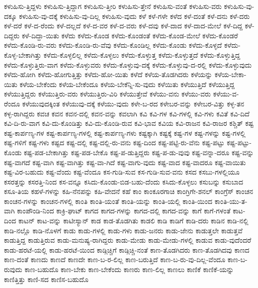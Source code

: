 {ಕಳುಹಿಸು-ತ್ತಿದ್ದಳು
ಕಳುಹಿಸು-ತ್ತಿದ್ದಾಗ
ಕಳುಹಿಸು-ತ್ತೀರಿ
ಕಳುಹಿಸು-ತ್ತೇನೆ
ಕಳುಹಿಸು-ವಂತೆ
ಕಳುಹಿಸು-ವರು
ಕಳುಹಿಸು-ವು-ದಕ್ಕೂ
ಕಳುಹಿಸು-ವು-ದಕ್ಕೆ
ಕಳುಹಿಸು-ವು-ದಿಲ್ಲ
ಕಳುಹಿಸು-ವುದು
ಕಳೆ
ಕಳೆ-ಗಳೇ
ಕಳೆದ
ಕಳೆ-ದಂತೆ
ಕಳೆ-ದನು
ಕಳೆ-ದರು
ಕಳೆ-ದರೆ
ಕಳೆ-ದ-ರೆಂದು
ಕಳೆ-ದಲ್ಲದೆ
ಕಳೆ-ದ-ವರ
ಕಳೆ-ದ-ವರು
ಕಳೆ-ದವು
ಕಳೆ-ದಾದ
ಕಳೆ-ದಾದ-ಮೇಲೆ
ಕಳೆ-ದಿದ್ದ
ಕಳೆ-ದಿದ್ದರು
ಕಳೆ-ದಿದ್ದಾ-ಯಿತು
ಕಳೆದು
ಕಳೆದು-ಕೊಂಡ
ಕಳೆದು-ಕೊಂಡಂತೆ
ಕಳೆದು-ಕೊಂಡ-ಮೇಲೆ
ಕಳೆದು-ಕೊಂಡರೆ
ಕಳೆದು-ಕೊಂಡಿ-ರು-ವರು
ಕಳೆದು-ಕೊಂಡಿ-ರು-ವೆವು
ಕಳೆದು-ಕೊಂಡಿಲ್ಲ
ಕಳೆದು-ಕೊಂಡು
ಕಳೆದು-ಕೊಳ್ಳದೆ
ಕಳೆದು-ಕೊಳ್ಳ-ಬೇಕಾಗಿತ್ತು
ಕಳೆದು-ಕೊಳ್ಳಲಿಲ್ಲ
ಕಳೆದು-ಕೊಳ್ಳಲು
ಕಳೆದು-ಕೊಳ್ಳುತ್ತ
ಕಳೆದು-ಕೊಳ್ಳುತ್ತದೆ
ಕಳೆದು-ಕೊಳ್ಳುತ್ತಿದ್ದ
ಕಳೆದು-ಕೊಳ್ಳುತ್ತಿರು-ವಾಗ
ಕಳೆದು-ಕೊಳ್ಳುವರು
ಕಳೆದು-ಕೊಳ್ಳುವು-ದಕ್ಕೆ
ಕಳೆದು-ಕೊಳ್ಳುವು-ದ-ರಲ್ಲಿ
ಕಳೆದು-ಕೊಳ್ಳುವುದು
ಕಳೆದು-ಹೋಗಿ
ಕಳೆದು-ಹೋಗುತ್ತಿತ್ತು
ಕಳೆದು-ಹೋ-ಯಿತು
ಕಳೆದೆ
ಕಳೆಯ-ತೊಡಗಿದರು
ಕಳೆಯನ್ನು
ಕಳೆಯ-ಬೇಕಾ-ಯಿತು
ಕಳೆಯ-ಬೇಕೆಂದು
ಕಳೆಯ-ಬೇಕೆಂದೂ
ಕಳೆಯ-ಬೇಕೆನ್ನಿ-ಸು-ವುದು
ಕಳೆಯಿತು
ಕಳೆಯುತ್ತಿದೆ
ಕಳೆಯುತ್ತಿದ್ದ
ಕಳೆಯುತ್ತಿದ್ದರು
ಕಳೆಯುತ್ತಿರು-ವರು
ಕಳೆಯುತ್ತಿರು-ವಿರಿ
ಕಳೆಯುತ್ತೇವೆ
ಕಳೆಯು-ವನು
ಕಳೆಯು-ವರು
ಕಳೆಯು-ವ-ರೆಂದೂ
ಕಳೆಯುವುದಕ್ಕಿಂತ
ಕಳೆಯುವು-ದಕ್ಕೆ
ಕಳೆಯು-ವುದು
ಕಳೇ-ಬ-ರದ
ಕಳೇಬರ-ವನ್ನು
ಕಳೇಬರ-ವಿತ್ತು
ಕಳ್ಳ-ತನ
ಕಳ್ಳ-ರಾಗಿದ್ದರು
ಕವಚ
ಕವನ
ಕವನ-ದಲ್ಲಿ
ಕವನ-ವನ್ನು
ಕವಲಾಗಿ
ಕವಿ
ಕವಿ-ಗಳ
ಕವಿ-ಗಳಲ್ಲಿ
ಕವಿ-ಗಳು
ಕವಿತೆ
ಕವಿ-ದಿದೆ
ಕವಿ-ದಿ-ರು-ವಾಗ
ಕವಿ-ದು-ಕೊಂಡಿತ್ತು
ಕವಿ-ದು-ಕೊಂಡಿ-ರುವ
ಕವಿ-ಭಾವ
ಕವಿಯ
ಕವಿ-ರಾಜನ
ಕವಿ-ರಾಜರ
ಕಶ್ಚಿತ್
ಕಷ್ಟ
ಕಷ್ಟ-ಕಾರ್ಪಣ್ಯ-ಗಳ
ಕಷ್ಟ-ಕಾರ್ಪಣ್ಯ-ಗಳಲ್ಲಿ
ಕಷ್ಟ-ಕಾರ್ಪಣ್ಯ-ಗಳು
ಕಷ್ಟಕ್ಕಾಗಿ
ಕಷ್ಟಕ್ಕೆ
ಕಷ್ಟ-ಗಳ
ಕಷ್ಟ-ಗಳನ್ನು
ಕಷ್ಟ-ಗಳಲ್ಲಿ
ಕಷ್ಟ-ಗಳಿಗೆ
ಕಷ್ಟ-ಗಳು
ಕಷ್ಟದ
ಕಷ್ಟ-ದಲ್ಲಿ
ಕಷ್ಟ-ದಲ್ಲಿ-ರು-ವನು
ಕಷ್ಟ-ದಿಂದ
ಕಷ್ಟ-ಪಟ್ಟಿ-ರು-ವೆನು
ಕಷ್ಟ-ಪಟ್ಟು
ಕಷ್ಟ-ಪಟ್ಟು-ಕೊಂಡು
ಕಷ್ಟ-ಪಡ-ಬೇಕಾಗಿತ್ತು
ಕಷ್ಟ-ಪಡ-ಬೇಕೊ
ಕಷ್ಟ-ಪ-ಡುತ್ತಿದ್ದರು
ಕಷ್ಟ-ಪ-ಡು-ವುವು
ಕಷ್ಟ-ವನ್ನಾ-ದರೂ
ಕಷ್ಟ-ವನ್ನು
ಕಷ್ಟ-ವಾಗದೆ
ಕಷ್ಟ-ವಾಗಿ
ಕಷ್ಟ-ವಾಗಿತ್ತು
ಕಷ್ಟ-ವಾ-ಗಿದೆ
ಕಷ್ಟ-ವಾಗು-ವುದು
ಕಷ್ಟ-ವಾದ
ಕಷ್ಟ-ವಾದರೂ
ಕಷ್ಟ-ವಾಯಿತು
ಕಷ್ಟ-ವಿರ-ಬಹುದು
ಕಷ್ಟ-ವೆಂದು
ಕಷ್ಟ-ವೆಂದೂ
ಕಸ-ಗುಡಿ-ಸುವ
ಕಸ-ಗುಡಿ-ಸುವ-ವನು
ಕಸದ
ಕಸಬು-ಗಳಲ್ಲಿಯೂ
ಕಸರತ್ತನ್ನು
ಕಸರತ್ತಿ-ನಿಂದ
ಕಸ-ವನ್ನೂ
ಕಸಿದು-ಕೊಂಡು-ಬಿಡ-ಬಹು-ದೆಂದು
ಕಸಿದು-ಕೊಳ್ಳಲು
ಕಸುಬನ್ನು
ಕಸುಬಾದ
ಕಸೂ-ತಿಯ
ಕಹಳೆ-ಗಳನ್ನು
ಕಹಿ-ನೆನಪನ್ನು
ಕಹಿ-ವೇದನೆ
ಕಹೆ
ಕಾಂ
ಕಾಂಕೂರಗಾಚಿ
ಕಾಂಗ್ರಿಗೇ-ಶನಲ್
ಕಾಂಗ್ರೆಸ್
ಕಾಂಚನ
ಕಾಂಚನ-ಗಳನ್ನು
ಕಾಂಚನ-ಗಳಲ್ಲಿ
ಕಾಂತಿ
ಕಾಂತಿ-ಯಂತೆ
ಕಾಂತಿ-ಯನ್ನು
ಕಾಂತಿ-ಯಲ್ಲಿ
ಕಾಂತಿ-ಯಿಂದ
ಕಾಂತಿ-ಯು-ತ-ವಾಗಿ
ಕಾಂಪೌಂಡಿ-ನಿಂದ
ಕಾಕ್ರಿ-ಘಾಟ್
ಕಾಗದ
ಕಾಗದ-ಗಳನ್ನು
ಕಾಗದ-ದಲ್ಲಿ
ಕಾಗದ-ವನ್ನು
ಕಾಗೆ
ಕಾಗೆ-ಗಳಂತೆ
ಕಾಟ-ದಿಂದ
ಕಾಟನ್
ಕಾಟ-ವನ್ನು
ಕಾಟೀಸ್ಯಾನ್
ಕಾಡ
ಕಾಡ-ತೊಡಗಿತು
ಕಾಡಲಿ
ಕಾಡಿ
ಕಾಡಿಗೆ
ಕಾಡಿ-ದರು
ಕಾಡಿನ
ಕಾಡಿ-ನಲ್ಲಿ
ಕಾಡಿ-ನಲ್ಲೊ
ಕಾಡಿ-ನೊಳಗೆ
ಕಾಡು
ಕಾಡು-ಗಳಲ್ಲಿ
ಕಾಡು-ಗಳು
ಕಾಡು-ಜನರು
ಕಾಡು-ಜೇನು
ಕಾಡುತ್ತಲೇ
ಕಾಡುತ್ತವೆ
ಕಾಡುತ್ತಿದ್ದ
ಕಾಡುತ್ತಿರುವ
ಕಾಡು-ಮನುಷ್ಯ-ರಾಗಿದ್ದರು
ಕಾಡು-ಮೇಡು
ಕಾಡು-ಮೇಡು-ಗಳಲ್ಲಿ
ಕಾಡುವ
ಕಾಡು-ವುದೆಂದರೆ
ಕಾಡು-ಹರಟೆ-ಯಲ್ಲಿ
ಕಾಡು-ಹರಟೆ-ಯಿಂದ
ಕಾಡ್ಗಿಚ್ಚಿಗೆ
ಕಾಡ್ಗಿಚ್ಚಿ-ನಂತೆ
ಕಾಣ-ತೊಡಗಿದರು
ಕಾಣ-ತೊಡಗಿದವು
ಕಾಣದ
ಕಾಣ-ದಂತೆ
ಕಾಣದು
ಕಾಣದೆ
ಕಾಣದೇ
ಕಾಣ-ಬ-ರ-ಲಿಲ್ಲ
ಕಾಣ-ಬರುತ್ತಿದೆ
ಕಾಣ-ಬ-ರು-ವು-ದಿಲ್ಲ-ವೆಂದೂ
ಕಾಣ-ಬ-ರುವುದು
ಕಾಣ-ಬಹುದೊ
ಕಾಣ-ಬೇಕು
ಕಾಣ-ಬೇಕೆಂದು
ಕಾಣರು
ಕಾಣ-ಲಿಲ್ಲ
ಕಾಣಲು
ಕಾಣಿಕೆ
ಕಾಣಿಕೆ-ಯನ್ನು
ಕಾಣಿತ್ತಿತ್ತು
ಕಾಣಿ-ಸದ
ಕಾಣಿಸ-ಬಹುದೊ
}
